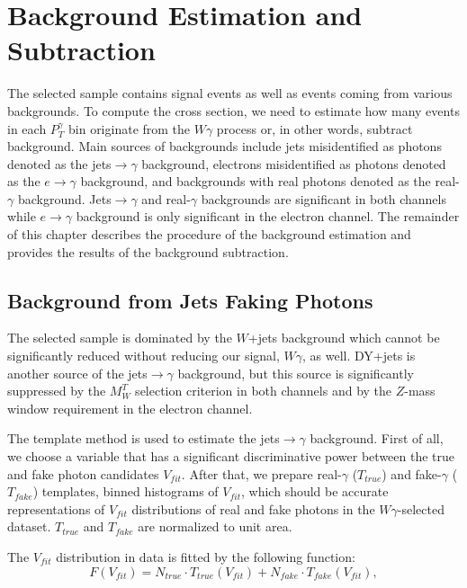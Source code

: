 \section{Background Estimation and Subtraction}
\label{sec:BackgroundSubtraction}

The selected sample contains signal events as well as events coming from various backgrounds. To compute the cross section, we need to estimate how many events in each $P_T^\gamma$ bin originate from the $W\gamma$ process or, in other words, subtract background. Main sources of backgrounds include jets misidentified as photons denoted as the jets$\rightarrow\gamma$ background, electrons misidentified as photons denoted as the $e\rightarrow\gamma$ background, and backgrounds with real photons denoted as the real-$\gamma$ background. Jets$\rightarrow\gamma$ and real-$\gamma$ backgrounds are significant in both channels while $e\rightarrow\gamma$ background is only significant in the electron channel. The remainder of this chapter describes the procedure of the background estimation and provides the results of the background subtraction.

\subsection{Background from Jets Faking Photons}
\label{sec:BackgroundSubtraction_jtog}

The selected sample is dominated by the $W$+jets background which cannot be significantly reduced without reducing our signal, $W\gamma$, as well. DY+jets is another source of the jets$\rightarrow \gamma$ background, but this source is significantly suppressed by the $M_W^T$ selection criterion in both channels and by the $Z$-mass window requirement in the electron channel.

The template method is used to estimate the jets$ \rightarrow \gamma$ background. First of all, we choose a variable that has a significant discriminative power between the true and fake photon candidates $V_{fit}$. After that, we prepare real-$\gamma$ ($T_{true}$) and fake-$\gamma$ ($T_{fake}$) templates, binned histograms of $V_{fit}$, which should be accurate representations of $V_{fit}$ distributions of real and fake photons in the $W\gamma$-selected dataset. $T_{true}$ and $T_{fake}$ are normalized to unit area. 

The $V_{fit}$ distribution in data is fitted by the following function: 
\begin{equation}\label{eq:F_fit}
F(V_{fit})=N_{true} \cdot T_{true}(V_{fit}) + N_{fake} \cdot T_{fake}(V_{fit}),
\end{equation}

